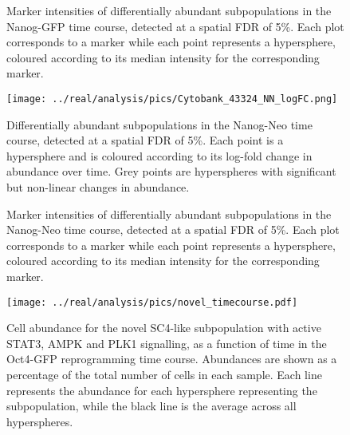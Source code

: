 \documentclass{article}
\begin{document}
\begin{figure}[p]
    \begin{center}
    \end{center}
    \caption{
        Marker intensities of differentially abundant subpopulations in the Nanog-GFP time course, detected at a spatial FDR of 5\%.
        Each plot corresponds to a marker while each point represents a hypersphere, coloured according to its median intensity for the corresponding marker.
    }
\end{figure}

\begin{figure}[p]
    \begin{center}
    \texttt{[image: ../real/analysis/pics/Cytobank\_43324\_NN\_logFC.png]}
    \end{center}
    \caption{
        Differentially abundant subpopulations in the Nanog-Neo time course, detected at a spatial FDR of 5\%.
        Each point is a hypersphere and is coloured according to its log-fold change in abundance over time.
        Grey points are hyperspheres with significant but non-linear changes in abundance.
    }
\end{figure}

\begin{figure}[p]
    \begin{center}
    \end{center}
    \caption{
        Marker intensities of differentially abundant subpopulations in the Nanog-Neo time course, detected at a spatial FDR of 5\%.
        Each plot corresponds to a marker while each point represents a hypersphere, coloured according to its median intensity for the corresponding marker.
    }
\end{figure}

\begin{figure}[p]
    \begin{center}
        \texttt{[image: ../real/analysis/pics/novel\_timecourse.pdf]}
    \end{center}
    \caption{
        Cell abundance for the novel SC4-like subpopulation with active STAT3, AMPK and PLK1 signalling, as a function of time in the Oct4-GFP reprogramming time course.
        Abundances are shown as a percentage of the total number of cells in each sample.
        Each line represents the abundance for each hypersphere representing the subpopulation, while the black line is the average across all hyperspheres.
    }
\end{figure}
\end{document}
